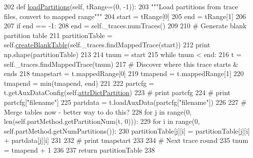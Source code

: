 \begin{DoxyCode}
202     \textcolor{keyword}{def }\hyperlink{classsoftware_1_1chipwhisperer_1_1analyzer_1_1utils_1_1Partition_1_1Partition_a25bf9a8e5bffb48597af03eed3e88fb8}{loadPartitions}(self, tRange=(0, -1)):
203         \textcolor{stringliteral}{"""Load partitions from trace files, convert to mapped range"""}
204         start = tRange[0]
205         end = tRange[1]
206 
207         \textcolor{keywordflow}{if} end == -1:
208             end = self.\_traces.numTraces()
209 
210         \textcolor{comment}{# Generate blank partition table}
211         partitionTable = self.\hyperlink{classsoftware_1_1chipwhisperer_1_1analyzer_1_1utils_1_1Partition_1_1Partition_ab1059540a7484b4cb1d38568aac9a4ce}{createBlankTable}(self.\_traces.findMappedTrace(start))
212         \textcolor{keywordflow}{print} np.shape(partitionTable)
213 
214         tnum = start
215         \textcolor{keywordflow}{while} tnum < end:
216             t = self.\_traces.findMappedTrace(tnum)
217             \textcolor{comment}{# Discover where this trace starts & ends}
218             tmapstart = t.mappedRange[0]
219             tmapend = t.mappedRange[1]
220             tmapend = min(tmapend, end)
221 
222             partcfg = t.getAuxDataConfig(self.\hyperlink{classsoftware_1_1chipwhisperer_1_1analyzer_1_1utils_1_1Partition_1_1Partition_a1f010e20f7d43c561882412dc91567fc}{attrDictPartition})
223             \textcolor{comment}{# print partcfg}
224             \textcolor{comment}{# print partcfg["filename"]}
225             partdata = t.loadAuxData(partcfg[\textcolor{stringliteral}{"filename"}])
226 
227             \textcolor{comment}{# Merge tables now - better way to do this?}
228             \textcolor{keywordflow}{for} j \textcolor{keywordflow}{in} range(0, len(self.partMethod.getPartitionNum(t, 0))):
229                 \textcolor{keywordflow}{for} i \textcolor{keywordflow}{in} range(0, self.partMethod.getNumPartitions()):
230                     partitionTable[j][i] = partitionTable[j][i] + partdata[j][i]
231 
232             \textcolor{comment}{# print tmapstart}
233 
234             \textcolor{comment}{# Next trace round}
235             tnum = tmapend + 1
236 
237         \textcolor{keywordflow}{return} partitionTable
238 
\end{DoxyCode}
\hypertarget{classsoftware_1_1chipwhisperer_1_1analyzer_1_1utils_1_1Partition_1_1Partition_ae704605c5cab887f0353518d0b1f4310}{}
